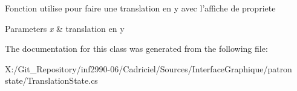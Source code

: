 Fonction utilise pour faire une translation en y avec l'affiche de propriete 


\begin{DoxyParams}{Parameters}
{\em x} & translation en y\\
\hline
\end{DoxyParams}


The documentation for this class was generated from the following file\-:\begin{DoxyCompactItemize}
\item 
X\-:/\-Git\-\_\-\-Repository/inf2990-\/06/\-Cadriciel/\-Sources/\-Interface\-Graphique/patron state/Translation\-State.\-cs\end{DoxyCompactItemize}
